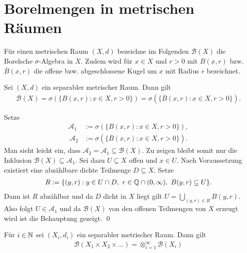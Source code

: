 \section{Borelmengen in metrischen Räumen}
Für einen metrischen Raum $(X,d)$ bezeichne im Folgenden $\mathcal{B}(X)$ die Borelsche $\sigma$-Algebra in $X$. 
Zudem wird für $x \in X$ und $r>0$ mit $B(x, r)$ bzw. $\overline{B}(x,r)$ die offene bzw. abgeschlossene Kugel um $x$ mit Radius $r$ bezeichnet.
\begin{proposition}
    Sei $(X,d)$ ein separabler metrischer Raum. Dann gilt
    \begin{align*}
        \mathcal{B}(X) = \sigma(\{B(x,r): x \in X, r > 0 \}) = \sigma(\{\overline{B}(x,r): x \in X, r > 0 \}). 
    \end{align*}
\end{proposition}
\begin{proof*}
    Setze 
    \begin{align*}
        \mathcal{A}_1 &:= \sigma(\{B(x,r): x \in X, r > 0 \}), \\\ 
        \mathcal{A}_2 &:= \sigma(\{\overline{B}(x,r): x \in X, r > 0 \}). 
    \end{align*}
    Man sieht leicht ein, dass $\mathcal{A}_2 = \mathcal{A}_1 \subseteq \mathcal{B}(X)$. Zu zeigen bleibt somit nur die Inklusion $\mathcal{B}(X) \subseteq \mathcal{A}_1$.
    Sei dazu $U \subseteq X$ offen und $x \in U$. Nach Voraussetzung existiert eine abzählbare dichte Teilmenge $D \subseteq X$. Setze  
    \begin{align*}
        R := \{(y,r) : y \in U \cap D, \ r \in \mathbb{Q} \cap (0, \infty), \  B(y,r) \subseteq U \}.
    \end{align*}
    Dann ist $R$ abzählbar und da $D$ dicht in $X$ liegt gilt $U = \bigcup_{(y,r) \in R}B(y,r)$. 
    Also folgt $U \in \mathcal{A}_1$ und da $\mathcal{B}(X)$ von den offenen Teilmengen von $X$ erzeugt wird ist die Behauptung gezeigt. \qed
\end{proof*}

\begin{proposition}
    Für $i \in \mathbb{N}$ sei $(X_i, d_i)$ ein separabler metrischer Raum. Dann gilt
    \begin{align*}
        \mathcal{B}(X_1 \times X_2 \times ...) = \otimes_{i=1}^{\infty}\mathcal{B}(X_i)
    \end{align*}
\end{proposition}

